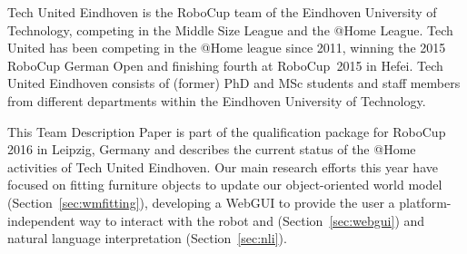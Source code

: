 Tech United Eindhoven is the RoboCup team of the Eindhoven University of Technology, competing in the Middle Size League and the @Home League. Tech United has been competing in the @Home league since 2011, winning the 2015 RoboCup German Open and finishing fourth at RoboCup~2015 in Hefei. 
Tech United Eindhoven consists of (former) PhD and MSc students and staff members from different departments within the Eindhoven University of Technology.

This Team Description Paper is part of the qualification package for RoboCup 2016 in Leipzig, Germany and describes the current status of the @Home activities of Tech United Eindhoven.
Our main research efforts this year have focused on fitting furniture objects to update our object-oriented world model (Section~\ref{sec:wmfitting}), developing a WebGUI to provide the user a platform-independent way to interact with the robot and (Section~\ref{sec:webgui}) and natural language interpretation (Section~\ref{sec:nli}).   
